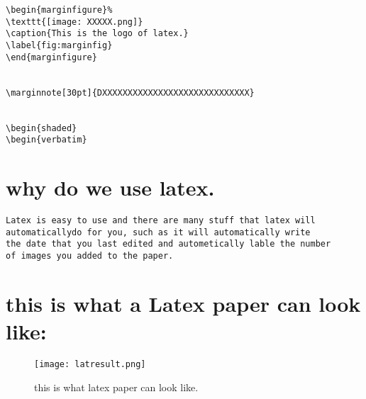 		\begin{framed}
			\begin{verbatim}
\begin{marginfigure}%
\texttt{[image: XXXXX.png]}
\caption{This is the logo of latex.}
\label{fig:marginfig}
\end{marginfigure}


\marginnote[30pt]{DXXXXXXXXXXXXXXXXXXXXXXXXXXXXX}


\begin{shaded}
\begin{verbatim}
			\end{verbatim}
		\end{framed}
		
\vspace{1cm}
\section{why do we use latex.}
	\begin{verbatim}
Latex is easy to use and there are many stuff that latex will 
automaticallydo for you, such as it will automatically write 
the date that you last edited and autometically lable the number 
of images you added to the paper.
	\end{verbatim}
	
	\vspace{1cm}
	\section{this is what a Latex paper can look like:}
	\marginnote[40pt]{}
		\begin{figure}
			\texttt{[image: latresult.png]}
			\caption{this is what latex paper can look like.}
			\label{fig:marginfig}
		\end{figure}
	
